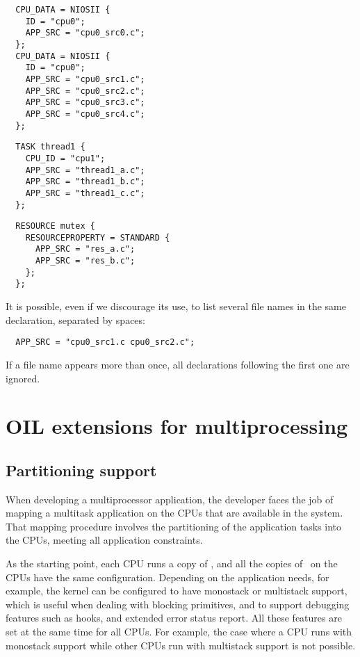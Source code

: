 \begin{lstlisting}
  CPU_DATA = NIOSII {
    ID = "cpu0";
    APP_SRC = "cpu0_src0.c";
  };
  CPU_DATA = NIOSII {
    ID = "cpu0";
    APP_SRC = "cpu0_src1.c";
    APP_SRC = "cpu0_src2.c";
    APP_SRC = "cpu0_src3.c";
    APP_SRC = "cpu0_src4.c";
  };
\end{lstlisting}

\begin{lstlisting}
  TASK thread1 {
    CPU_ID = "cpu1";
    APP_SRC = "thread1_a.c";
    APP_SRC = "thread1_b.c";
    APP_SRC = "thread1_c.c";
  };
\end{lstlisting}

\begin{lstlisting}
  RESOURCE mutex {
    RESOURCEPROPERTY = STANDARD {
      APP_SRC = "res_a.c";
      APP_SRC = "res_b.c";
    };
  };
\end{lstlisting}

It is possible, even if we discourage its use, to list several file
names in the same declaration, separated by spaces:

\begin{lstlisting}
  APP_SRC = "cpu0_src1.c cpu0_src2.c";
\end{lstlisting}

If a file name appears more than once, all declarations following the
first one are ignored.

\section{OIL extensions for multiprocessing}
\label{sec:oil-multicore}

\subsection{Partitioning support}
When developing a multiprocessor application, the developer faces the
job of mapping a multitask application on the CPUs that are available
in the system.  That mapping procedure involves the partitioning of
the application tasks into the CPUs, meeting all application
constraints.

As the starting point, each CPU runs a copy of \ee, and all the copies 
of \ee\ on the CPUs have the same configuration. Depending on the 
application needs, for example, the kernel can be configured to have 
monostack or multistack support, which is useful when dealing with 
blocking primitives, and to support debugging features such as hooks, 
and extended error status report. All these features are set at the same 
time for all CPUs. For example, the case where a CPU runs with monostack 
support while other CPUs run with multistack support is not possible. 

